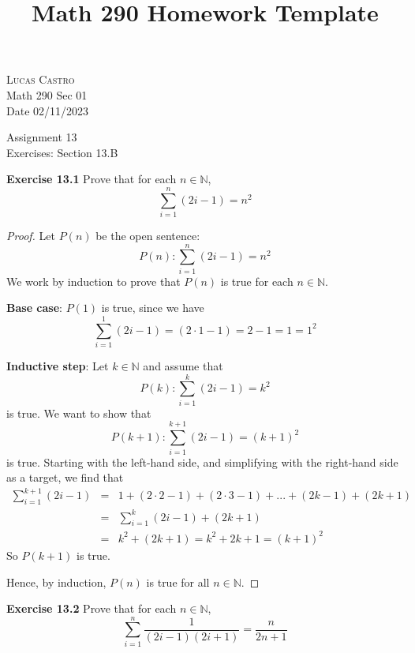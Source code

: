 \documentclass[12pt,oneside]{article}
\newenvironment{exercise}[1]{\vspace{.1in}\noindent\textbf{Exercise #1 \hspace{.05em}}}{}
\newcommand{\N}{\mathbb{N}}
\begin{document}
\title{Math 290 Homework Template}

\begin{flushright}
\textsc{Lucas Castro}  \\
Math 290 Sec 01\\
Date 02/11/2023
\end{flushright}

\begin{center}
\textsf{Assignment 13} \\
\textsf{Exercises: Section 13.B}
\end{center}


\begin{exercise}{13.1}
Prove that for each $n \in \N$,
\[\sum_{i = 1}^{n} (2i - 1) = n^2\]
\end{exercise}

\begin{proof}
Let $P(n)$ be the open sentence:
\[P(n): \sum_{i = 1}^{n} (2i - 1) = n^2\]
We work by induction to prove that $P(n)$ is true for each $n \in \N$.

\textbf{Base case}: $P(1)$ is true, since we have
\[\sum_{i = 1}^{1} (2i - 1) = (2\cdot1 - 1) = 2 - 1 = 1 = 1^2\]

\textbf{Inductive step}: Let $k \in \N$ and assume that
\[P(k): \sum_{i = 1}^{k} (2i - 1) = k^2\]
is true. We want to show that
\[P(k + 1): \sum_{i = 1}^{k + 1} (2i - 1) = (k+1)^2\]
is true. Starting with the left-hand side, and simplifying with the right-hand side as a target, we find that
\begin{eqnarray*}
\sum_{i = 1}^{k + 1} (2i - 1) &=& 1 + (2\cdot2 - 1) + (2\cdot3 - 1) + ... + (2k - 1) + (2k + 1) \\
&=& \sum_{i = 1}^{k} (2i - 1) + (2k + 1) \\
&=& k^2 + (2k + 1) = k^2 + 2k + 1 = (k + 1)^2
\end{eqnarray*}
So $P(k + 1)$ is true.

Hence, by induction, $P(n)$ is true for all $n \in \N$.
\end{proof}



\begin{exercise}{13.2}
Prove that for each $n \in \N$,
\[\sum_{i=1}^{n} \frac{1}{(2i-1)(2i+1)} = \frac{n}{2n + 1}\]
\end{exercise}
\end{document}
